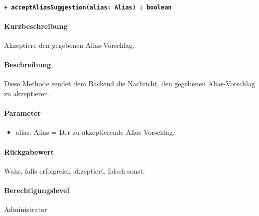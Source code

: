 \paragraph{\texttt{+ acceptAliasSuggestion(alias: Alias) : boolean}}%
\paragraph*{Kurzbeschreibung}
Akzeptiere den gegebenen Alias-Vorschlag.
\paragraph*{Beschreibung}
Diese Methode sendet dem Backend die Nachricht, den gegebenen Alias-Vorschlag zu akzeptieren.
\paragraph*{Parameter}
\begin{itemize}
    \item alias: Alias = Der zu akzeptierende Alias-Vorschlag.
\end{itemize}
\paragraph*{Rückgabewert}
Wahr, falls erfolgreich akzeptiert, falsch sonst.
\paragraph*{Berechtigungslevel}
Administrator